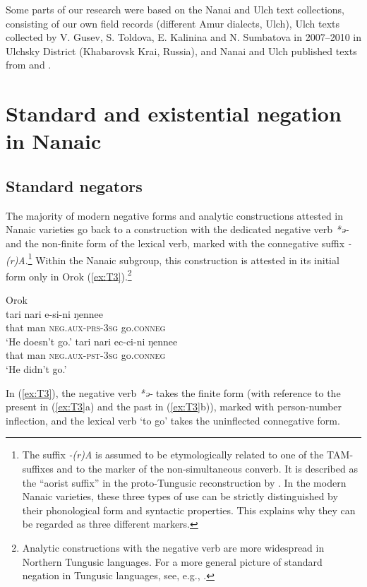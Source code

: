 \documentclass[output=paper]{langscibook}
\begin{document}
Some parts of our research were based on the Nanai and Ulch text collections, consisting of our own field records (different Amur dialects, Ulch), Ulch texts collected by V. Gusev, S. Toldova, E. Kalinina and N. Sumbatova in 2007–2010 in Ulchsky District (Khabarovsk Krai, Russia), and Nanai and Ulch published texts from \citet{avrorin1986a} and \citet{sunik1985a}.

\section{Standard and existential negation in Nanaic}\label{sec:T4}
\subsection{Standard negators}\label{sec:T4.1}

The majority of modern negative forms and analytic constructions attested in Nanaic varieties go back to a construction with the dedicated negative verb \textit{*ə-} and the non-finite form of the lexical verb, marked with the connegative suffix \textit{-(r)A}.\footnote{\label{footnote:4}The suffix \textit{-(r)A} is assumed to be etymologically related to one of the TAM-suffixes and to the marker of the non-simultaneous converb. It is described as the “aorist suffix” in the proto-Tungusic reconstruction by \citet[124 ff., 146]{benzing1955a}. In the modern Nanaic varieties, these three types of use can be strictly distinguished by their phonological form and syntactic properties. This explains why they can be regarded as three different markers.} Within the Nanaic subgroup, this construction is attested in its initial form only in Orok (\ref{ex:T3}).\footnote{Analytic constructions with the negative verb are more widespread in Northern Tungusic languages. For a more general picture of standard negation in Tungusic languages, see, e.g., \citet{hoelzl2015a}.}

\ea Orok \label{ex:T3}\\
  \ea
	\gll tari	nari	e-si-ni	ŋennee\\
	that	man	\textsc{neg.aux-prs-3sg}	go.\textsc{conneg}\\
    \glt `He doesn’t go.' \citep[13]{tsumagari2009a}
  \ex
	\gll tari	nari	ec-ci-ni	ŋennee\\
	that	man	\textsc{neg.aux-pst-3sg}	go.\textsc{conneg}\\
	\glt `He didn’t go.' \citep[13]{tsumagari2009a}
\z \z

In (\ref{ex:T3}), the negative verb \textit{*ə-} takes the finite form (with reference to the present in (\ref{ex:T3}a) and the past in (\ref{ex:T3}b)), marked with person-number inflection, and the lexical verb ‘to go’ takes the uninflected connegative form.
\end{document}
